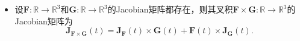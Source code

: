 \begin{itemize}
\begin{equation*}
   \end{equation*}
   其中$f_i,g_i : \mathbb{R}^{n} \rightarrow \mathbb{R}$,的导数为
	\begin{equation*}
		\nabla \left( \langle \mathbf{F}(x), \mathbf{G}(x) \rangle \right) = \mathbf{F}^{\top}(x) \mathbf{J}_{\mathbf{G}}(x) + \mathbf{G}^{\top}(x) \mathbf{J}_{\mathbf{F}}(x).
	\end{equation*}
  	\item[$(6)$] 设$\mathbf{F} : \mathbb{R} \rightarrow \mathbb{R}^{3}$和$\mathbf{G}: \mathbb{R} \rightarrow \mathbb{R}^{3}$的Jacobian矩阵都存在，则其叉积$\mathbf{F} \times \mathbf{G} : \mathbb{R} \rightarrow \mathbb{R}^{3}$的Jacobian矩阵为
	\begin{equation*}
		\mathbf{J}_{ \mathbf{F} \times \mathbf{G} } (t)  = \mathbf{J}_{\mathbf{F}}(t) \times \mathbf{G}(t) + \mathbf{F}(t) \times \mathbf{J}_{\mathbf{G}}(t).
	\end{equation*}
 
\end{itemize}